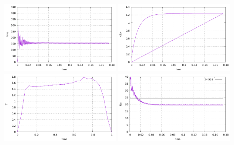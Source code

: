 \begin{center}
\includegraphics[width=6cm]{python_codes/fieldstone_51/images/vrms.pdf}
\includegraphics[width=6cm]{python_codes/fieldstone_51/images/avrgT.pdf}\\
\includegraphics[width=6cm]{python_codes/fieldstone_51/images/temp_hyptenuse.pdf}
\includegraphics[width=6cm]{python_codes/fieldstone_51/images/Nu.pdf}
\end{center}

